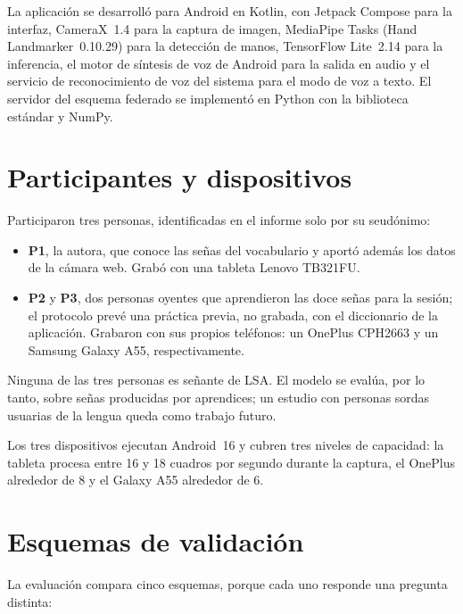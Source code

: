 La aplicación se desarrolló para Android en Kotlin, con Jetpack Compose para la interfaz, CameraX~1.4 para la captura de imagen, MediaPipe Tasks (Hand Landmarker~0.10.29) para la detección de manos, TensorFlow Lite~2.14 para la inferencia, el motor de síntesis de voz de Android para la salida en audio y el servicio de reconocimiento de voz del sistema para el modo de voz a texto. El servidor del esquema federado se implementó en Python con la biblioteca estándar y NumPy.

\section{Participantes y dispositivos}

Participaron tres personas, identificadas en el informe solo por su seudónimo:

\begin{itemize}
    \item \textbf{P1}, la autora, que conoce las señas del vocabulario y aportó además los datos de la cámara web. Grabó con una tableta Lenovo TB321FU.
    \item \textbf{P2} y \textbf{P3}, dos personas oyentes que aprendieron las doce señas para la sesión; el protocolo prevé una práctica previa, no grabada, con el diccionario de la aplicación. Grabaron con sus propios teléfonos: un OnePlus CPH2663 y un Samsung Galaxy A55, respectivamente.
\end{itemize}

Ninguna de las tres personas es señante de LSA. El modelo se evalúa, por lo tanto, sobre señas producidas por aprendices; un estudio con personas sordas usuarias de la lengua queda como trabajo futuro.

Los tres dispositivos ejecutan Android~16 y cubren tres niveles de capacidad: la tableta procesa entre 16 y 18 cuadros por segundo durante la captura, el OnePlus alrededor de 8 y el Galaxy A55 alrededor de 6.

\section{Esquemas de validación}
\label{sec:esquemas}

La evaluación compara cinco esquemas, porque cada uno responde una pregunta distinta:

